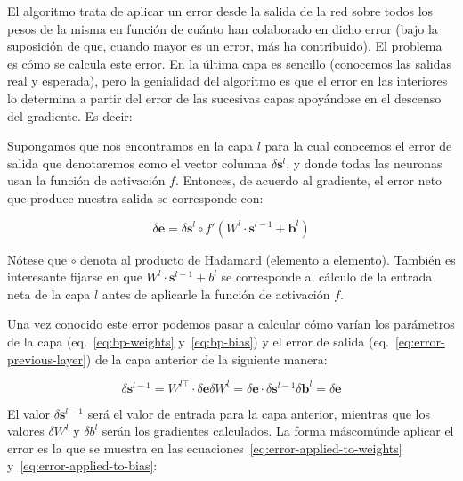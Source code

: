 El algoritmo trata de aplicar un error desde la salida de la red sobre todos los pesos de la misma en función de cuánto han colaborado en dicho error (bajo la suposición de que, cuando mayor es un error, más ha contribuido). El problema es cómo se calcula este error. En la última capa es sencillo (conocemos las salidas real y esperada), pero la genialidad del algoritmo es que el error en las interiores lo determina a partir del error de las sucesivas capas apoyándose en el descenso del gradiente. Es decir:

Supongamos que nos encontramos en la capa $l$ para la cual conocemos el error de salida que denotaremos como el vector columna $\delta \mathbf{s}^l$, y donde todas las neuronas usan la función de activación $f$. Entonces, de acuerdo al gradiente, el error neto que produce nuestra salida se corresponde con:

\begin{equation}
	\delta \mathbf{e} = \delta \mathbf{s}^l \circ f'(W^l \cdot \mathbf{s}^{l-1} + \mathbf{b}^l)
\end{equation}

Nótese que $\circ$ denota al producto de Hadamard (elemento a elemento). También es interesante fijarse en que $W^l \cdot \mathbf{s}^{l-1} + b^l$ se corresponde al cálculo de la entrada neta de la capa $l$ antes de aplicarle la función de activación $f$.

Una vez conocido este error podemos pasar a calcular cómo varían los parámetros de la capa (eq.~\ref{eq:bp-weights} y~\ref{eq:bp-bias}) y el error de salida (eq.~\ref{eq:error-previous-layer}) de la capa anterior de la siguiente manera:

\begin{subequations}
	\begin{equation}
		\delta \mathbf{s}^{l-1} = W^{l\top} \cdot \delta \mathbf{e} \label{eq:error-previous-layer}
	\end{equation}
	\begin{equation}
		\delta W^l = \delta \mathbf{e} \cdot \delta \mathbf{s}^{l-1} \label{eq:bp-weights}
	\end{equation}
	\begin{equation}
		\delta \mathbf{b}^l = \delta \mathbf{e} \label{eq:bp-bias}
	\end{equation}
\end{subequations}

El valor $\delta \mathbf{s}^{l-1}$ será el valor de entrada para la capa anterior, mientras que los valores $\delta W^l$ y $\delta b^l$ serán los gradientes calculados. La forma máscomúnde aplicar el error es la que se muestra en las ecuaciones~\ref{eq:error-applied-to-weights} y~\ref{eq:error-applied-to-bias}:

